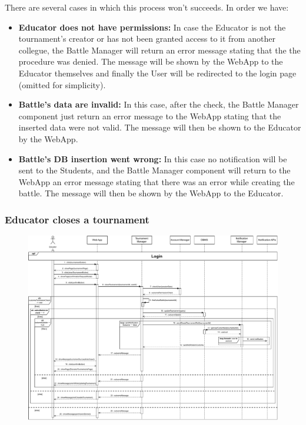 \documentclass{article}
\begin{document}
{        There are several cases in which this process won't succeeds. In order we have:
        \begin{itemize}
            \item \textbf{Educator does not have permissions:} In case the Educator is not the 
            tournament's creator or has not been granted access to it from another collegue, 
            the Battle Manager will return an error message stating that the the procedure was 
            denied. 
            The message will be shown by the WebApp to the Educator themselves and finally
            the User will be redirected to the login page (omitted for simplicity).
            \item \textbf{Battle's data are invalid:} In this case, after the check, the Battle 
            Manager component just return an error message to the WebApp stating that the 
            inserted data were not valid. The message will then be shown to the Educator by 
            the WebApp.
            \item \textbf{Battle's DB insertion went wrong:} In this case no 
            notification will be sent to the Students, and the Battle Manager component will 
            return to the WebApp an error message stating that there was an error while 
            creating the battle.
            The message will then be shown by the WebApp to the Educator.
        \end{itemize}


    \subsubsection{Educator closes a tournament}
        \begin{figure}[H]
            \centering
            \hspace*{-4cm}\includegraphics[scale=0.65]{Sequence/Sequence7DD.pdf}
            \caption{}
            \label{fig:Sequence7DD}
        \end{figure}

}
\end{document}
